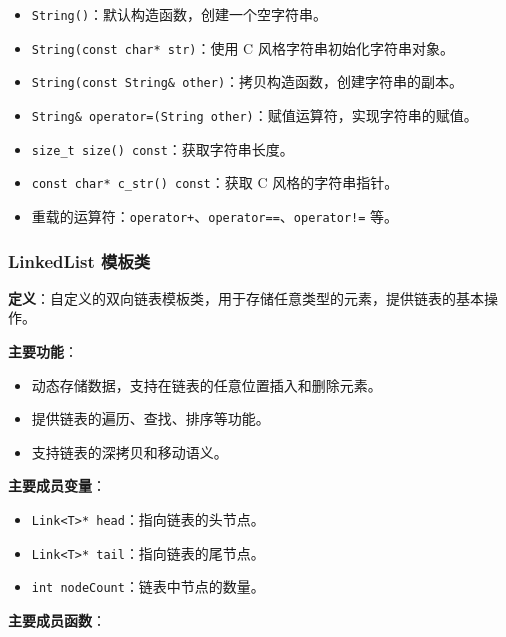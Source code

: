 \documentclass[UTF8, a4paper,12pt]{ctexart}
\begin{document}
\begin{itemize}
    \item \texttt{String()}：默认构造函数，创建一个空字符串。
    \item \texttt{String(const char* str)}：使用 C 风格字符串初始化字符串对象。
    \item \texttt{String(const String\& other)}：拷贝构造函数，创建字符串的副本。
    \item \texttt{String\& operator=(String other)}：赋值运算符，实现字符串的赋值。
    \item \texttt{size\_t size() const}：获取字符串长度。
    \item \texttt{const char* c\_str() const}：获取 C 风格的字符串指针。
    \item 重载的运算符：\texttt{operator+}、\texttt{operator==}、\texttt{operator!=} 等。
\end{itemize}

\subsubsection{LinkedList 模板类}

\textbf{定义}：自定义的双向链表模板类，用于存储任意类型的元素，提供链表的基本操作。

\textbf{主要功能}：

\begin{itemize}
    \item 动态存储数据，支持在链表的任意位置插入和删除元素。
    \item 提供链表的遍历、查找、排序等功能。
    \item 支持链表的深拷贝和移动语义。
\end{itemize}

\textbf{主要成员变量}：

\begin{itemize}
    \item \texttt{Link<T>* head}：指向链表的头节点。
    \item \texttt{Link<T>* tail}：指向链表的尾节点。
    \item \texttt{int nodeCount}：链表中节点的数量。
\end{itemize}

\textbf{主要成员函数}：
\end{document}
